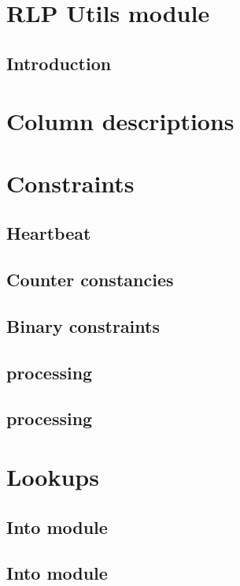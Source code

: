 
\section{RLP Utils module}
\subsection{Introduction}                
\section{Column descriptions}            \label{rlputils: column descriptions}             

\section{Constraints}
\subsection{Heartbeat}                   
\subsection{Counter constancies}        
\subsection{Binary constraints}         
\subsection{ processing}         
\subsection{ processing}         

\section{Lookups}
\subsection{Into \wcpMod{} module}                   
\subsection{Into \shfMod{} module}                   
